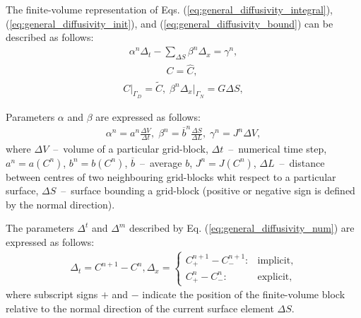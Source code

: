 \documentclass[a4paper,14pt,english]{extreport}
\begin{document}
The finite-volume representation of Eqs. (\ref{eq:general_diffusivity_integral}), (\ref{eq:general_diffusivity_init}), and (\ref{eq:general_diffusivity_bound}) can be described as follows:
    \begin{eqnarray}
        \label{eq:general_diffusivity_num}
        \alpha^n \Delta_{t} - \sum_{\Delta S} \beta^n\Delta_{x} = \gamma^n,
    \end{eqnarray}
    \begin{eqnarray}
         \label{eq:general_diffusivity_num_init}
        C = \hat{C}, \; 
    \end{eqnarray}
    \begin{eqnarray}
    \label{eq:general_diffusivity_num_bound}
    C \Big|_{\mathit{\Gamma}_D}= \tilde{C}, \; \beta^n\Delta_x \Big|_{\mathit{\Gamma}_N} = G\Delta S,
    \end{eqnarray}

Parameters $\alpha$ and $\beta$ are expressed as follows:
    \begin{eqnarray}
        \label{eq:general_alpha_beta_gamma}
        \alpha^n = a^n\frac{\Delta V}{\Delta t}, \;
        \beta^n = \overline{b}^n\frac{\Delta S}{\Delta L}, \; \gamma^n = J^n \Delta V,
    \end{eqnarray}
where $\Delta V$~--~volume of a particular grid-block, $\Delta t$~--~numerical time step, $a^n = a\left(C^n\right)$, $b^n = b\left(C^n\right)$, $\overline{b}$~--~average $b$, $J^n=J\left(C^n\right)$, $\Delta L$~--~distance between centres of two neighbouring grid-blocks whit respect to a particular surface, $\Delta S$~--~surface bounding a grid-block (positive or negative sign is defined by the normal direction).

The parameters $\Delta^{t}$ and $\Delta^{m}$ described by Eq. (\ref{eq:general_diffusivity_num}) are expressed as follows:
    \begin{eqnarray}
    \label{eq:general_delta_num}
    \Delta_t = C^{n+\mathit{1}} - C^{n}, \Delta_x = \begin{cases}
    C_{+}^{n+\mathit{1}} - C_{-}^{n+\mathit{1}} : &\text{implicit},\\
        C_{+}^{n} - C_{-}^{n} : &\text{explicit},
    \end{cases}
    \end{eqnarray}
where subscript signs $+$ and $-$ indicate the position of the finite-volume block relative to the normal direction of the current surface element $\Delta S$.
\end{document}
